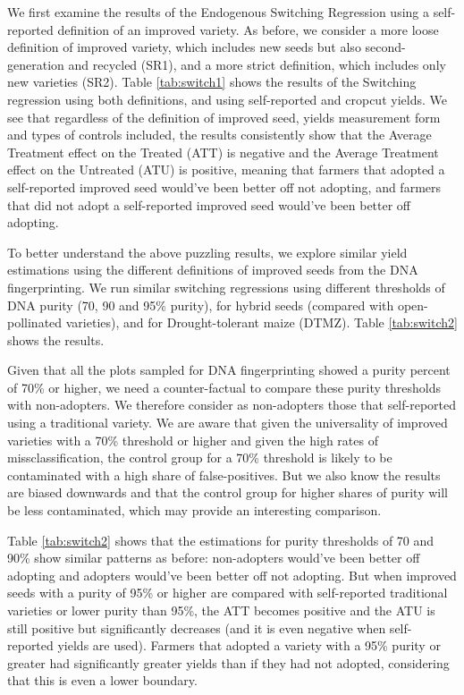 \documentclass{article}
\begin{document}
We first examine the results of the Endogenous Switching Regression using a self-reported definition of an improved variety. As before, we consider a more loose definition of improved variety, which includes new seeds but also second-generation and recycled (SR1), and a more strict definition, which includes only new varieties (SR2). Table \ref{tab:switch1} shows the results of the Switching regression using both definitions, and using self-reported and cropcut yields. We see that regardless of the definition of improved seed, yields measurement form and types of controls included, the results consistently show that the Average Treatment effect on the Treated (ATT) is negative and the Average Treatment effect on the Untreated (ATU) is positive, meaning that farmers that adopted a self-reported improved seed would've been better off not adopting, and farmers that did not adopt a self-reported improved seed would've been better off adopting. 



To better understand the above puzzling results, we explore similar yield estimations using the different definitions of improved seeds from the DNA fingerprinting. We run similar switching regressions using different thresholds of DNA purity (70, 90 and 95\% purity), for hybrid seeds (compared with open-pollinated varieties), and for Drought-tolerant maize (DTMZ). Table \ref{tab:switch2} shows the results. 

Given that all the plots sampled for DNA fingerprinting showed a purity percent of 70\% or higher, we need a counter-factual to compare these purity thresholds with non-adopters. We therefore consider as non-adopters those that self-reported using a traditional variety. We are aware that given the universality of improved varieties with a 70\% threshold or higher and given the high rates of missclassification, the control group for a 70\% threshold is likely to be contaminated with a high share of false-positives. But we also know the results are biased downwards and that the control group for higher shares of purity will be less contaminated, which may provide an interesting comparison. 

Table \ref{tab:switch2} shows that the estimations for purity thresholds of 70 and 90\% show similar patterns as before: non-adopters would've been better off adopting and adopters would've been better off not adopting. But when improved seeds with a purity of 95\% or higher are compared with self-reported traditional varieties or lower purity than 95\%, the ATT becomes positive and the ATU is still positive but significantly decreases (and it is even negative when self-reported yields are used). Farmers that adopted a variety with a 95\% purity or greater had significantly greater yields than if they had not adopted, considering that this is even a lower boundary. 
\end{document}
